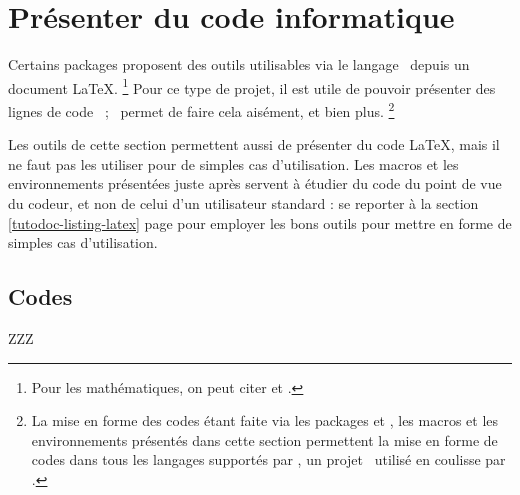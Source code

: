 \documentclass{../main/main}
\begin{document}
\section{Présenter du code informatique}

Certains packages proposent des outils utilisables via le langage \lua\ depuis un document \LaTeX.%
\footnote{
	Pour les mathématiques, on peut citer  et .
}
Pour ce type de projet, il est utile de pouvoir présenter des lignes de code \lua\ ; \thisproj\ permet de faire cela aisément, et bien plus.%
\footnote{
    La mise en forme des codes étant faite via les packages  et , les macros et les environnements présentés dans cette section permettent la mise en forme de codes dans tous les langages supportés par \pygmentsREF, un projet \python\ utilisé en coulisse par .
}


\begin{tdoccaut}
	Les outils de cette section permettent aussi de présenter du code \LaTeX, mais il ne faut pas les utiliser pour de simples cas d'utilisation.
	Les macros et les environnements présentées juste après servent à étudier du code du point de vue du codeur, et non de celui d'un utilisateur standard : se reporter à la section \ref{tutodoc-listing-latex} page \pageref{tutodoc-listing-latex} pour employer les bons outils pour mettre en forme de simples cas d'utilisation.
\end{tdoccaut}



\subsection{Codes }

ZZZ




\end{document}
